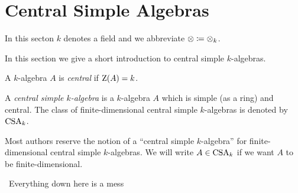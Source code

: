 \section{Central Simple Algebras}


\begin{conventions}
  In this secton $k$ denotes a field and we abbreviate $\otimes \coloneqq \otimes_k$.
\end{conventions}


\begin{fluff}
  In this section we give a short introduction to central simple $k$-algebras.
\end{fluff}


\begin{definition}
  A $k$-algebra $A$ is \emph{central} if $\operatorname{Z}(A) = k$.
\end{definition}


\begin{definition}
  A \emph{central simple $k$-algebra} is a $k$-algebra $A$ which is simple (as a ring) and central.
  The class of finite-dimensional central simple $k$-algebras is denoted by $\operatorname{CSA}_k$.
\end{definition}


\begin{remark}
  Most authors reserve the notion of a \enquote{central simple $k$-algebra} for finite-dimensional central simple $k$-algebras.
  We will write $A \in \operatorname{CSA}_k$ if we want $A$ to be finite-dimensional.
\end{remark}













\noindent\hrulefill\, Everything down here is a mess \,\hrulefill




